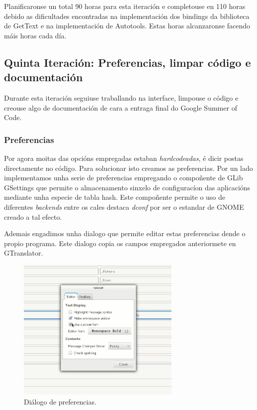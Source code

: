 Planificaronse un total 90 horas para esta iteración e completouse en 110 horas debido as dificultades encontradas na implementación dos bindings da biblioteca de GetText e na implementación de Autotools. Estas horas alcanzaronse facendo máis horas cada día.

\subsection{Quinta Iteración: Preferencias, limpar código e documentación}
Durante esta iteración seguiuse traballando na interface, limpouse o código e creouse algo de documentación de cara a entraga final do Google Summer of Code.

\subsubsection{Preferencias}
Por agora moitas das opcións empregadas estaban \emph{hardcodeadas}, é dicir postas directamente no código. Para solucionar isto creamos as preferencias. Por un lado implementamos unha serie de preferencias empregando o compoñente de GLib GSettings que permite o almacenamento sinxelo de configuracíon das aplicacións mediante unha especie de tabla hash. Este compoñente permite o uso de diferentes \emph{backends} entre os cales destaca \emph{dconf} por ser o estandar de GNOME creado a tal efecto.

Ademais engadimos unha dialogo que permite editar estas preferencias dende o propio programa. Este dialogo copia os campos empregados anteriormete en GTranslator.

\begin{figure}[h]
    \centering
    \includegraphics[width=0.7\textwidth]{img/gsoc1_it5_prefs.png}
    \caption{Diálogo de preferencias.}
    \label{fig:gsoc1_it5_prefs}
\end{figure}

